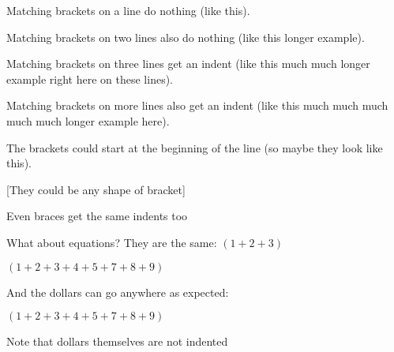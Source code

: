 \documentclass{article}
\begin{document}
Matching brackets on a line do nothing (like this).

Matching brackets on two lines also do nothing (like this
longer example).

Matching brackets on three lines get an indent (like this
much much longer example
right here on these lines).

Matching brackets on more lines also get an indent (like this
much much
much much
much longer example
here).

The brackets could start at the beginning of the line
(so maybe
they look
like this).

[They could
be any shape
of bracket]

{Even braces get
the same
indents too}

What about equations? They are the same:
$(1 + 2 + 3)$

$(1 + 2
+ 3 + 4
+ 5 + 7
+ 8 + 9)$

And the dollars can go anywhere as expected:

$
(1 + 2
+ 3 + 4
+ 5 + 7
+ 8 + 9)
$

Note that dollars themselves are not indented
\end{document}
